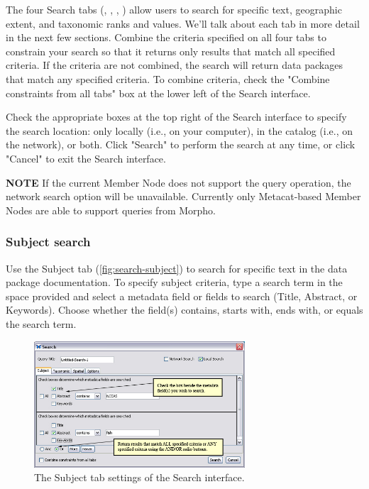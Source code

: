 The four Search tabs (,
, ,
) allow users to search for specific text,
geographic extent, and taxonomic ranks and values. We'll talk about each
tab in more detail in the next few sections. Combine the criteria
specified on all four tabs to constrain your search so that it returns
only results that match all specified criteria. If the criteria are not
combined, the search will return data packages that match any specified
criteria. To combine criteria, check the "Combine constraints from all
tabs" box at the lower left of the Search interface. 

Check the appropriate boxes at the top right of the Search interface to
specify the search location: only locally (i.e., on your computer), in
the catalog (i.e., on the network), or both.  Click "Search" to
perform the search at any time, or click "Cancel" to exit the Search
interface.

\begin{shaded}
  \textbf{NOTE} If the current Member Node does not support the query operation, 
  the network search option will be unavailable. Currently only Metacat-based 
  Member Nodes are able to support queries from Morpho.
\end{shaded}

\subsubsection[Subject]{Subject search} \label{sec:search-subject}

Use the Subject tab (\autoref{fig:search-subject}) to search for
specific text in the data package documentation. To specify subject
criteria, type a search term in the space provided and select a metadata
field or fields to search (Title, Abstract, or Keywords). Choose whether
the field(s) contains, starts with, ends with, or equals the search
term. 

\begin{figure}
  \centering
    \includegraphics[width=0.7\textwidth]{images/search-subject.jpg}
  \caption{The Subject tab settings of the Search interface.}
  \label{fig:search-subject}
\end{figure}

